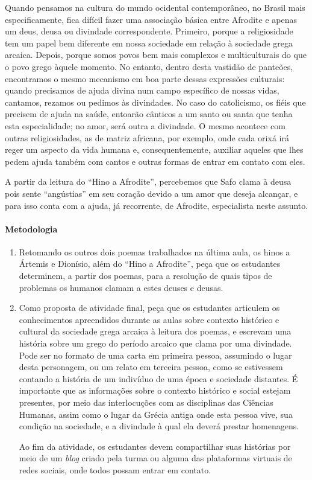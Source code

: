 \documentclass[12pt]{extarticle}
\begin{document}
Quando pensamos na cultura do mundo ocidental contemporâneo, no Brasil mais
especificamente, fica difícil fazer uma associação básica entre Afrodite e apenas
um deus, deusa ou divindade correspondente. Primeiro, porque a religiosidade
tem um papel bem diferente em nossa sociedade em relação à sociedade grega
arcaica. Depois, porque somos povos bem mais complexos e multiculturais do que 
o povo grego àquele momento. No entanto, dentro desta vastidão de panteões,
encontramos o mesmo mecanismo em boa parte dessas expressões culturais: 
quando precisamos de ajuda divina num campo específico de nossas vidas, 
cantamos, rezamos ou pedimos às divindades. No caso do catolicismo, os fiéis
que precisem de ajuda na saúde, entoarão cânticos a um santo ou santa que
tenha esta especialidade; no amor, será outra a divindade. O mesmo acontece
com outras religiosidades, as de matriz africana, por exemplo, onde cada
orixá irá reger um aspecto da vida humana e, consequentemente, auxiliar 
aqueles que lhes pedem ajuda também com cantos e outras formas de entrar
em contato com eles.

A partir da leitura do ``Hino a Afrodite'', percebemos que Safo clama
à deusa pois sente ``angústias'' em seu coração devido a um amor
que deseja alcançar, e para isso conta com a ajuda, já recorrente,
de Afrodite, especialista neste assunto. 


\paragraph{Metodologia}

\begin{enumerate}
\item
Retomando os outros dois poemas trabalhados na última aula, os hinos a 
Ártemis e Dionísio, além do ``Hino a Afrodite'', peça que os estudantes 
determinem, a partir dos poemas, para a resolução de quais tipos de 
problemas os humanos clamam a estes deuses e deusas. 

\item
Como proposta de atividade final, peça que os estudantes articulem
os conhecimentos apreendidos durante as aulas sobre contexto histórico e cultural
da sociedade grega arcaica à leitura dos poemas, e escrevam 
uma história sobre um grego do período arcaico que clama por uma
divindade. Pode ser no formato de uma carta em primeira pessoa, assumindo o lugar
desta personagem, ou um relato em terceira pessoa, como se estivessem contando a história
de um indivíduo de uma época e sociedade distantes. É importante que as informações 
sobre o contexto histórico e social estejam presentes, por meio das interlocuções com as 
disciplinas das Ciências Humanas, assim como o lugar da Grécia antiga 
onde esta pessoa vive, sua condição na sociedade, e a divindade à qual ela deverá
prestar homenagens. 

Ao fim da atividade, os estudantes devem compartilhar suas histórias por meio de um
\textit{blog} criado pela turma ou alguma das plataformas virtuais de redes sociais,
onde todos possam entrar em contato.
\end{enumerate}
\end{document}
